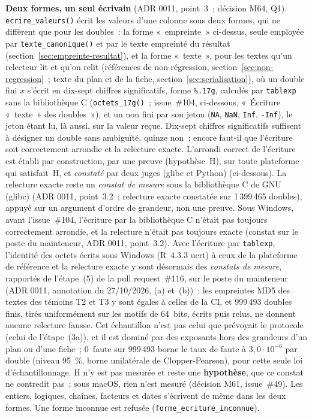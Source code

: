 \documentclass[a4paper,11pt]{article}
\newcommand{\code}[1]{\texttt{\small #1}}
\begin{document}
\noindent
\textbf{Deux formes, un seul écrivain} (ADR 0011, point~3~; décision M64,
Q1). \code{ecrire\_valeurs()} écrit les valeurs d'une colonne sous deux
formes, qui ne diffèrent que pour les doubles~: la forme «~empreinte~»
ci-dessus, seule employée par \code{texte\_canonique()} et par le texte
empreinté du résultat (section~\ref{sec:empreinte-resultat}), et la forme
«~texte~», pour les textes qu'un relecteur lit et qu'on relit (références de
non-régression, section~\ref{sec:non-regression}~; texte du plan et de la
fiche, section~\ref{sec:serialisation}), où un double fini $x$
s'écrit en dix-sept chiffres significatifs, forme \code{\%.17g}, calculés
par \code{tablexp} sans la bibliothèque C (\code{octets\_17g()}~; issue~\#104,
ci-dessous, «~Écriture «~texte~» des doubles~»), et un non fini par son
jeton (\code{NA}, \code{NaN}, \code{Inf}, \code{-Inf}), le jeton étant lu, là
aussi, sur la valeur reçue. Dix-sept chiffres significatifs suffisent à
désigner un double sans ambiguïté, quinze non~; encore faut-il que l'écriture
soit correctement arrondie et la relecture exacte. L'arrondi correct de
l'écriture est établi par construction, par une preuve (hypothèse~H), sur
toute plateforme qui satisfait~H, et \emph{constaté} par deux juges (glibc
et Python) (ci-dessous). La relecture exacte reste un \emph{constat de
mesure} sous la bibliothèque C de GNU (glibc) (ADR 0011, point~3.2~;
relecture exacte constatée sur 1\,399\,465 doubles), appuyé sur un argument
d'ordre de grandeur, non une preuve. Sous Windows, avant l'issue~\#104,
l'écriture par la bibliothèque C n'était pas toujours correctement
arrondie, et la relecture n'était pas toujours exacte (constat sur le poste
du mainteneur, ADR 0011, point~3.2). Avec l'écriture par \code{tablexp},
l'identité des octets écrits sous Windows (R~4.3.3 ucrt) à ceux de la
plateforme de référence et la relecture exacte y sont désormais des
\emph{constats de mesure}, rapportés de l'étape~(5) de la pull
request~\#116, sur le poste du mainteneur (ADR 0011, annotation du
27/10/2026, (a) et~(b))~: les empreintes MD5 des textes des témoins T2 et
T3 y sont égales à celles de la CI, et 999\,493 doubles finis, tirés
uniformément sur les motifs de 64~bits, écrits puis relus, ne donnent
aucune relecture fausse. Cet échantillon n'est pas celui que prévoyait le
protocole (celui de l'étape~(3a)), et il est dominé par des exposants hors
des grandeurs d'un plan ou d'une fiche~; 0~faute sur 999\,493 borne le taux
de faute à $3{,}0 \cdot 10^{-6}$ par double (niveau 95~\%, borne
unilatérale de Clopper-Pearson), pour cette seule loi d'échantillonnage.
H n'y est pas mesurée et reste une \textbf{hypothèse}, que ce constat ne
contredit pas~; sous macOS, rien n'est mesuré (décision M61,
issue~\#49). Les entiers, logiques, chaînes, facteurs et
dates s'écrivent de même dans les deux formes. Une forme inconnue est
refusée (\code{forme\_ecriture\_inconnue}).
\end{document}
